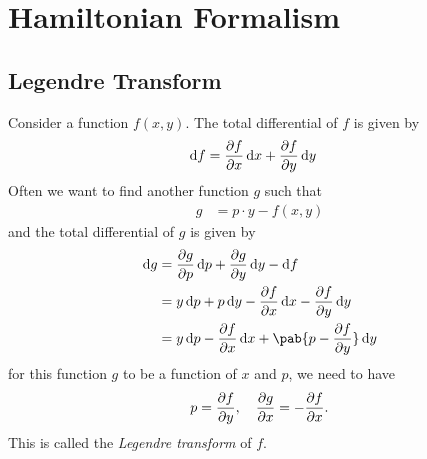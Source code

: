\section{Hamiltonian Formalism}
\subsection{Legendre Transform}
Consider a function $f(x, y)$.
The total differential of $f$ is given by
\begin{align}
  \odif{f} & = \pdv{f}{x} \odif{x} + \pdv{f}{y} \odif{y}
\end{align}
Often we want to find another function $g$ such that
\begin{align}
  g & = p \cdot y - f(x, y)
\end{align}
and the total differential of $g$ is given by
\begin{align}
  \odif{g} & = \pdv{g}{p} \odif{p} + \pdv{g}{y} \odif{y} - \odif{f}                \\
           & = y \odif{p} + p \odif{y} - \pdv{f}{x} \odif{x} - \pdv{f}{y} \odif{y} \\
           & = y \odif{p} - \pdv{f}{x} \odif{x} + \pab{p - \pdv{f}{y}} \odif{y}
\end{align}
for this function $g$ to be a function of $x$ and $p$, we need to have
\begin{align}
  p = \pdv{f}{y}, \quad \pdv{g}{x} = - \pdv{f}{x}.
\end{align}
This is called the \emph{Legendre transform} of $f$.

\cite{eman-legendreTransform}

